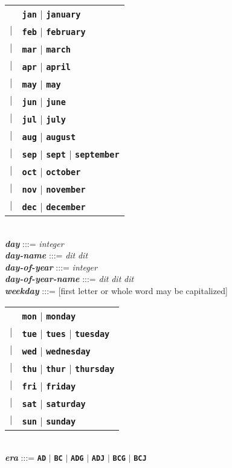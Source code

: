 \documentclass[12pt]{article}
\newcommand{\TT}[1]{{\tt \bfseries #1}}
\newcommand{\emkey}[1]{{\em \bfseries #1}}
\newenvironment{indpar}[1][0.3in]%
	{\begin{list}{}%
		     {\setlength{\itemsep}{0in}%
		      \setlength{\topsep}{0in}%
		      \setlength{\parsep}{1ex}%
		      \setlength{\labelwidth}{#1}%
		      \setlength{\leftmargin}{#1}%
		      \addtolength{\leftmargin}{\labelsep}}%
	 \item}%
	{\end{list}}
\begin{document}
\begin{indpar}
    \hspace*{0.5in}\begin{tabular}[t]{rl}
        & \TT{jan} $|$ \TT{january} \\
    $|$ & \TT{feb} $|$ \TT{february} \\
    $|$ & \TT{mar} $|$ \TT{march} \\
    $|$ & \TT{apr} $|$ \TT{april} \\
    $|$ & \TT{may} $|$ \TT{may} \\
    $|$ & \TT{jun} $|$ \TT{june} \\
    $|$ & \TT{jul} $|$ \TT{july} \\
    $|$ & \TT{aug} $|$ \TT{august} \\
    $|$ & \TT{sep} $|$ \TT{sept} $|$ \TT{september} \\
    $|$ & \TT{oct} $|$ \TT{october} \\
    $|$ & \TT{nov} $|$ \TT{november} \\
    $|$ & \TT{dec} $|$ \TT{december} \\
    \end{tabular}
\\[1ex]
\emkey{day} :::=  {\em integer}
\\[1ex]
\emkey{day-name} :::=  {\em dit} {\em dit}
\\[1ex]
\emkey{day-of-year} :::=  {\em integer}
\\[1ex]
\emkey{day-of-year-name} :::=  {\em dit} {\em dit} {\em dit}
\\[1ex]
\emkey{weekday} :::= [first letter or whole word may be capitalized] \\
    \hspace*{0.5in}\begin{tabular}[t]{rl}
        & \TT{mon} $|$ \TT{monday} \\
    $|$ & \TT{tue} $|$ \TT{tues} $|$ \TT{tuesday} \\
    $|$ & \TT{wed} $|$ \TT{wednesday} \\
    $|$ & \TT{thu} $|$ \TT{thur} $|$ \TT{thursday} \\
    $|$ & \TT{fri} $|$ \TT{friday} \\
    $|$ & \TT{sat} $|$ \TT{saturday} \\
    $|$ & \TT{sun} $|$ \TT{sunday} \\
    \end{tabular}
\\[1ex]
\emkey{era} :::=  \TT{AD} $|$ \TT{BC} $|$ \TT{ADG} $|$ \TT{ADJ}
                          $|$ \TT{BCG} $|$ \TT{BCJ}
\end{indpar}
\end{document}
